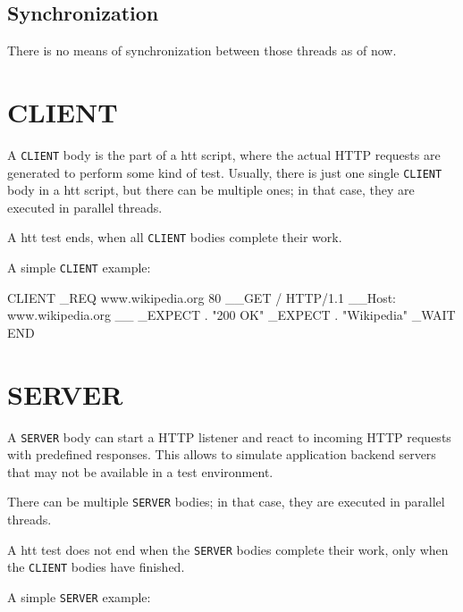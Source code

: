 \subsection{Synchronization}
There is no means of synchronization between those threads as of now.



\newpage
\section{CLIENT}
\label{chap:client}

A \texttt{CLIENT} body is the part of a htt script, where the actual HTTP requests 
are generated to perform some kind of test. Usually, there is just one single 
\texttt{CLIENT} body in a htt script, but there can be multiple ones; in that case, 
they are executed in parallel threads.

A htt test ends, when all \texttt{CLIENT} bodies complete their work.

A simple \texttt{CLIENT} example:

\begin{usplisting}
    CLIENT
    _REQ www.wikipedia.org 80
    __GET / HTTP/1.1
    __Host: www.wikipedia.org
    __
    _EXPECT . "200 OK"
    _EXPECT . "Wikipedia"
    _WAIT
    END
\end{usplisting}



\newpage
\section{SERVER}
\label{chap:server}

A \texttt{SERVER} body can start a HTTP listener and react to incoming HTTP 
requests with predefined responses. This allows to simulate application 
backend servers that may not be available in a test environment. 

There can be multiple \texttt{SERVER} bodies; in that case, 
they are executed in parallel threads.

A htt test does not end when the \texttt{SERVER} bodies complete their work, 
only when the \texttt{CLIENT} bodies have finished.

A simple \texttt{SERVER} example:

